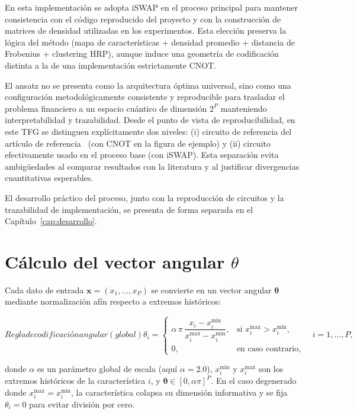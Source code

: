 En esta implementación se adopta iSWAP en el proceso principal para mantener consistencia con el código reproducido del proyecto y con la construcción de matrices de densidad utilizadas en los experimentos. Esta elección preserva la lógica del método (mapa de características + densidad promedio + distancia de Frobenius + clustering \gls{HRP}), aunque induce una geometría de codificación distinta a la de una implementación estrictamente CNOT.

El ansatz no se presenta como la arquitectura óptima universal, sino como una configuración metodológicamente consistente y reproducible para trasladar el problema financiero a un espacio cuántico de dimensión $2^P$ manteniendo interpretabilidad y trazabilidad. Desde el punto de vista de reproducibilidad, en este TFG se distinguen explícitamente dos niveles: (i) circuito de referencia del artículo de referencia~\cite{arian2025qhrp} (con CNOT en la figura de ejemplo) y (ii) circuito efectivamente usado en el proceso base (con iSWAP). Esta separación evita ambigüedades al comparar resultados con la literatura y al justificar divergencias cuantitativas esperables.

El desarrollo práctico del proceso, junto con la reproducción de circuitos y la trazabilidad de implementación, se presenta de forma separada en el Capítulo~\ref{cap:desarrollo}.

\section[Cálculo del vector angular theta]{Cálculo del vector angular $\theta$}
\label{ap:calculo_theta}

Cada dato de entrada $\mathbf{x} = (x_1, \dots, x_P)$ se convierte en un vector angular $\boldsymbol{\theta}$ mediante normalización afín respecto a extremos históricos:

\begin{equation}[eq:theta_qhrp]{Regla de codificación angular (global)}
\theta_i =
\begin{cases}
\alpha\,\pi\,\dfrac{x_i - x_i^{\min}}{x_i^{\max} - x_i^{\min}}, & \text{si } x_i^{\max} > x_i^{\min}, \\
0, & \text{en caso contrario},
\end{cases}
\quad i = 1, \dots, P,
\end{equation}

donde $\alpha$ es un parámetro global de escala (aquí $\alpha=2.0$), $x_i^{\min}$ y $x_i^{\max}$ son los extremos históricos de la característica $i$, y $\boldsymbol{\theta}\in[0,\alpha\pi]^P$. En el caso degenerado donde $x_i^{\max}=x_i^{\min}$, la característica colapsa su dimensión informativa y se fija $\theta_i=0$ para evitar división por cero.

